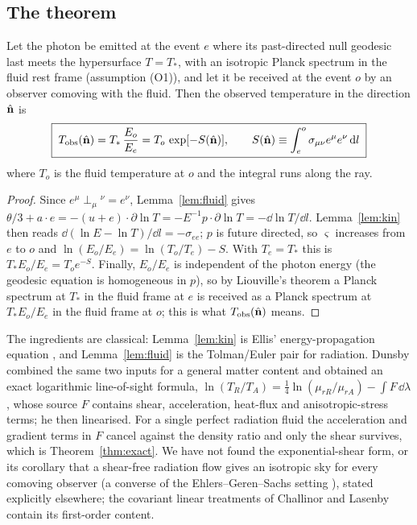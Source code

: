 \subsection{The theorem}
\begin{theorem}\label{thm:exact}
Let the photon be emitted at the event $e$ where its past-directed null geodesic last meets the
hypersurface $T=T_*$, with an isotropic Planck spectrum in the fluid rest frame (assumption (O1)), and let it be received
at the event $o$ by an observer comoving with the fluid.  Then the observed temperature in the direction
$\hat{\mathbf n}$ is
\begin{equation}
\boxed{\;T_{\rm obs}(\hat{\mathbf n})=T_*\,\frac{E_o}{E_e}=T_o\,\exp[-S(\hat{\mathbf n})],\qquad
S(\hat{\mathbf n})\equiv\int_e^o\sigma_{\mu\nu}e^\mu e^\nu\,\mathrm d l\;}
\label{eq:exact}
\end{equation}
where $T_o$ is the fluid temperature at $o$ and the integral runs along the ray.
\end{theorem}
\begin{proof}
Since $e^\mu \perp_\mu{}^\nu=e^\nu$, Lemma~\ref{lem:fluid} gives
$\theta/3+a\cdot e=-(u+e)\cdot\partial\ln T=-E^{-1}p\cdot\partial\ln T=-\dd\ln T/\dd l$.
Lemma~\ref{lem:kin} then reads $\dd(\ln E-\ln T)/\dd l=-\sigma_{ee}$; $p$ is future directed, so $\varsigma$
increases from $e$ to $o$ and $\ln(E_o/E_e)=\ln(T_o/T_e)-S$.  With $T_e=T_*$ this is
$T_*E_o/E_e=T_oe^{-S}$.  Finally, $E_o/E_e$ is independent of the photon energy (the geodesic equation is
homogeneous in $p$), so by Liouville's theorem a Planck spectrum at $T_*$ in the fluid frame at $e$ is
received as a Planck spectrum at $T_*E_o/E_e$ in the fluid frame at $o$; this is what $T_{\rm obs}(\hat{\mathbf n})$ means.
\end{proof}

\begin{remark}
The ingredients are classical: Lemma~\ref{lem:kin} is Ellis' energy-propagation equation \cite{Ellis71}, and
Lemma~\ref{lem:fluid} is the Tolman/Euler pair for radiation.  Dunsby \cite{Dunsby97} combined the same two inputs
for a general matter content and obtained an exact logarithmic line-of-sight formula,
$\ln(T_R/T_A)=\tfrac14\ln(\mu_{rR}/\mu_{rA})-\int F\,\dd\lambda$, whose source $F$ contains shear, acceleration,
heat-flux and anisotropic-stress terms; he then linearised.  For a single perfect radiation fluid the acceleration and
gradient terms in $F$ cancel against the density ratio and only the shear survives, which is
Theorem~\ref{thm:exact}.  We have not found the exponential-shear form, or its corollary that a shear-free radiation
flow gives an isotropic sky for every comoving observer (a converse of the Ehlers--Geren--Sachs setting
\cite{EGS,SME}), stated explicitly elsewhere; the covariant linear treatments of Challinor and Lasenby
\cite{CL98} contain its first-order content.
\end{remark}

